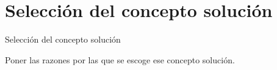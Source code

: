 \section{Selecci\'on del concepto soluci\'on}
\label{Seleccion_concepto_solucion}

Selecci\'on del concepto soluci\'on
\par
Poner las razones por las que se escoge ese concepto soluci\'on.